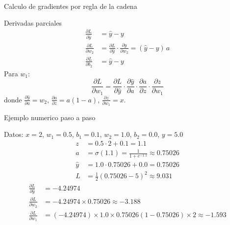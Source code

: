 \documentclass[aspectratio=169, 10pt, xcolor=table]{beamer}
\begin{document}
\begin{frame}{Calculo de gradientes por regla de la cadena}
    \begin{block}{Derivadas parciales}
        \begin{align*}
            \frac{\partial L}{\partial \hat{y}} &= \hat{y}-y \\
            \frac{\partial L}{\partial w_2} &= \frac{\partial L}{\partial \hat{y}}\cdot\frac{\partial \hat{y}}{\partial w_2} = (\hat{y}-y)\,a \\
            \frac{\partial L}{\partial b_2} &= \hat{y}-y
        \end{align*}
        Para $w_1$:
        \[
        \frac{\partial L}{\partial w_1} = \frac{\partial L}{\partial \hat{y}}\cdot\frac{\partial \hat{y}}{\partial a}\cdot\frac{\partial a}{\partial z}\cdot\frac{\partial z}{\partial w_1}
        \]
        donde $\frac{\partial \hat{y}}{\partial a}=w_2$, $\frac{\partial a}{\partial z}=a(1-a)$, $\frac{\partial z}{\partial w_1}=x$.
    \end{block}
\end{frame}

\begin{frame}{Ejemplo numerico paso a paso}
    \begin{exampleblock}{Datos: $x=2$, $w_1=0.5$, $b_1=0.1$, $w_2=1.0$, $b_2=0.0$, $y=5.0$}
        \begin{align*}
            z &= 0.5\cdot2 + 0.1 = 1.1 \\
            a &= \sigma(1.1) = \frac{1}{1+e^{-1.1}}\approx 0.75026 \\
            \hat{y} &= 1.0\cdot0.75026 + 0.0 = 0.75026 \\
            L &= \frac{1}{2}(0.75026-5)^2 \approx 9.031
        \end{align*}
        \begin{align*}
            \frac{\partial L}{\partial \hat{y}} &= -4.24974 \\
            \frac{\partial L}{\partial w_2} &= -4.24974 \times 0.75026 \approx -3.188 \\
            \frac{\partial L}{\partial w_1} &= (-4.24974) \times 1.0 \times 0.75026(1-0.75026) \times 2 \approx -1.593
        \end{align*}
    \end{exampleblock}
\end{frame}

\end{document}
